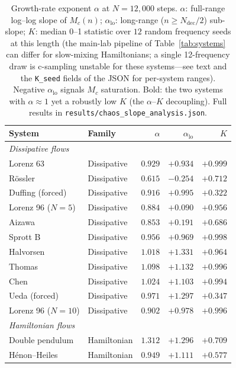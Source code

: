 \documentclass[aip,cha,preprint,amsmath,amssymb,floatfix]{revtex4-2}
\begin{document}
\begin{table}[ht]
\centering
\small
\caption{Growth-rate exponent $\alpha$ at $N=12{,}000$ steps. $\alpha$:
full-range log--log slope of $M_c(n)$; $\alpha_{\mathrm{lo}}$: long-range
($n\ge N_{\mathrm{dec}}/2$) sub-slope; $K$: median 0--1 statistic over $12$
random frequency seeds at this length (the main-lab pipeline of
Table~\ref{tab:systems} can differ for slow-mixing Hamiltonians; a single
12-frequency draw is c-sampling unstable for these systems---see text and the
\texttt{K\_seed} fields of the JSON for per-system ranges). Negative $\alpha_{\mathrm{lo}}$ signals $M_c$ saturation.
Bold: the two systems with $\alpha\approx1$ yet a robustly low $K$ (the
$\alpha$--$K$ decoupling). Full results in
\texttt{results/chaos\_slope\_analysis.json}.}
\label{tab:slope}
\begin{tabular}{llrrr}
\toprule
System & Family & $\alpha$ & $\alpha_{\mathrm{lo}}$ & $K$ \\
\midrule
\multicolumn{5}{l}{\textit{Dissipative flows}} \\
Lorenz 63              & Dissipative & $0.929$ & $+0.934$ & $+0.999$ \\
R\"{o}ssler            & Dissipative & $0.615$ & $-0.254$ & $+0.712$ \\
Duffing (forced)       & Dissipative & $0.916$ & $+0.995$ & $+0.322$ \\
Lorenz 96 ($N=5$)     & Dissipative & $0.884$ & $+0.090$ & $+0.956$ \\
Aizawa                 & Dissipative & $0.853$ & $+0.191$ & $+0.686$ \\
Sprott B               & Dissipative & $0.956$ & $+0.969$ & $+0.998$ \\
Halvorsen              & Dissipative & $1.018$ & $+1.331$ & $+0.964$ \\
Thomas                 & Dissipative & $1.098$ & $+1.132$ & $+0.996$ \\
Chen                   & Dissipative & $1.024$ & $+1.103$ & $+0.994$ \\
Ueda (forced)          & Dissipative & $0.971$ & $+1.297$ & $+0.347$ \\
Lorenz 96 ($N=10$)    & Dissipative & $0.902$ & $+0.978$ & $+0.996$ \\
\midrule
\multicolumn{5}{l}{\textit{Hamiltonian flows}} \\
Double pendulum                  & Hamiltonian & $1.312$ & $+1.296$ & $+0.709$ \\
H\'{e}non--Heiles                & Hamiltonian & $0.949$ & $+1.111$ & $+0.577$ \\

\end{tabular}
\end{table}
\end{document}
